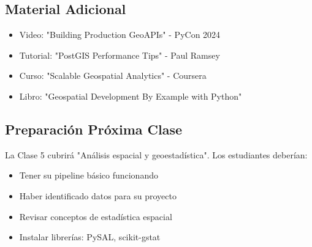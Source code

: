 \documentclass[11pt,a4paper]{article}
\begin{document}
\subsection{Material Adicional}
\begin{itemize}
    \item Video: "Building Production GeoAPIs" - PyCon 2024
    \item Tutorial: "PostGIS Performance Tips" - Paul Ramsey
    \item Curso: "Scalable Geospatial Analytics" - Coursera
    \item Libro: "Geospatial Development By Example with Python"
\end{itemize}

\subsection{Preparación Próxima Clase}
La Clase 5 cubrirá "Análisis espacial y geoestadística". Los estudiantes deberían:
\begin{itemize}
    \item Tener su pipeline básico funcionando
    \item Haber identificado datos para su proyecto
    \item Revisar conceptos de estadística espacial
    \item Instalar librerías: PySAL, scikit-gstat
\end{itemize}
\end{document}
